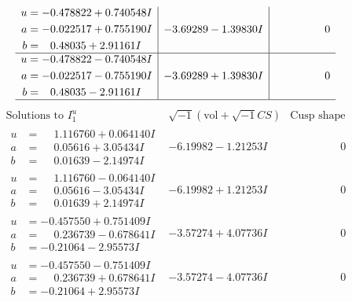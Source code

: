 \documentclass[1p]{elsarticle_modified}
\theoremstyle{definition}
\newcommand{\I}{\sqrt{-1}}
\begin{document}
$$\begin{array}{c|c|c}
\begin{aligned}
u &= -0.478822 + 0.740548 I \\
a &= -0.022517 + 0.755190 I \\
b &= \phantom{-}0.48035 + 2.91161 I\end{aligned}
 & -3.69289 - 1.39830 I & \phantom{-0.000000 } 0 \\ \hline\begin{aligned}
u &= -0.478822 - 0.740548 I \\
a &= -0.022517 - 0.755190 I \\
b &= \phantom{-}0.48035 - 2.91161 I\end{aligned}
 & -3.69289 + 1.39830 I & \phantom{-0.000000 } 0\\
 \hline 
 \end{array}$$\newpage$$\begin{array}{c|c|c}  
\text{Solutions to }I^u_{1}& \I (\text{vol} + \sqrt{-1}CS) & \text{Cusp shape}\\
 \hline 
\begin{aligned}
u &= \phantom{-}1.116760 + 0.064140 I \\
a &= \phantom{-}0.05616 + 3.05434 I \\
b &= \phantom{-}0.01639 - 2.14974 I\end{aligned}
 & -6.19982 - 1.21253 I & \phantom{-0.000000 } 0 \\ \hline\begin{aligned}
u &= \phantom{-}1.116760 - 0.064140 I \\
a &= \phantom{-}0.05616 - 3.05434 I \\
b &= \phantom{-}0.01639 + 2.14974 I\end{aligned}
 & -6.19982 + 1.21253 I & \phantom{-0.000000 } 0 \\ \hline\begin{aligned}
u &= -0.457550 + 0.751409 I \\
a &= \phantom{-}0.236739 - 0.678641 I \\
b &= -0.21064 - 2.95573 I\end{aligned}
 & -3.57274 + 4.07736 I & \phantom{-0.000000 } 0 \\ \hline\begin{aligned}
u &= -0.457550 - 0.751409 I \\
a &= \phantom{-}0.236739 + 0.678641 I \\
b &= -0.21064 + 2.95573 I\end{aligned}
 & -3.57274 - 4.07736 I & \phantom{-0.000000 } 0 \\ \hline\begin{aligned}

\end{aligned}
\end{array}$$
\end{document}
